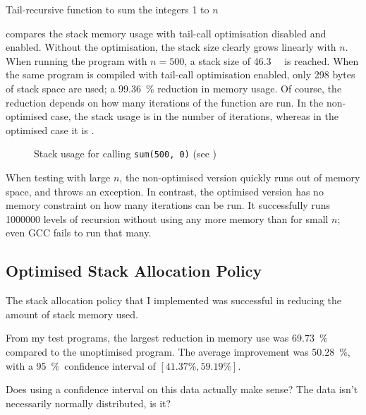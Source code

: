 \documentclass[00-main.tex]{subfiles}
\begin{document}
\begin{listing}[ht]
  \caption{Tail-recursive function to sum the integers 1 to $n$}
  \label{lst:tail-recursive sum}
\end{listing}


 compares the stack memory usage with tail-call optimisation disabled and enabled.
Without the optimisation, the stack size clearly grows linearly with $n$.
When running the program with $n=500$, a stack size of \SI{46.3}{\kilo\byte} is reached.
When the same program is compiled with tail-call optimisation enabled, only 298 bytes of stack space are used; a \SI{99.36}{\percent} reduction in memory usage.
Of course, the reduction depends on how many iterations of the function are run.
In the non-optimised case, the stack usage is  in the number of iterations, whereas in the optimised case it is .

\begin{figure}[ht]
  \centering
  \caption{Stack usage for calling \texttt{sum(500, 0)} (see )}
  \label{fig:plot:tail-call optimisation stack use}
\end{figure}

When testing with large $n$, the non-optimised version quickly runs out of memory space, and throws an exception.
In contrast, the optimised version has no memory constraint on how many iterations can be run.
It successfully runs \num{1000000} levels of recursion without using any more memory than for small $n$; even GCC fails to run that many.


\subsection{Optimised Stack Allocation Policy}

The stack allocation policy that I implemented was successful in reducing the amount of stack memory used.

From my test programs, the largest reduction in memory use was \SI{69.73}{\percent} compared to the unoptimised program.
The average improvement was \SI{50.28}{\percent}, with a \SI{95}{\percent}~confidence interval of $[41.37\%, 59.19\%]$.

\begin{Comment}
Does using a confidence interval on this data actually make sense? The data isn't necessarily normally distributed, is it?
\end{Comment}
\end{document}
